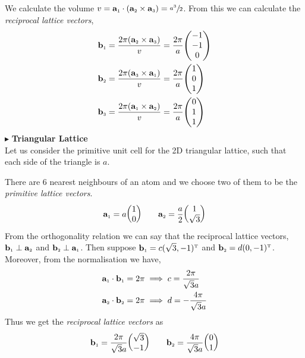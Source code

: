 \documentclass[usenames, svgnames, dvipsnames]{scrartcl}
\newcommand{\tund}[1]{_{\text{\tiny #1}}}
\begin{document}
We calculate the volume $v = \vb{a}\tund{1}\cdot (\vb{a}\tund{2}\times\vb{a}\tund{3} ) = \sfrac{a^3}{2}$. From this we can calculate the \textit{reciprocal lattice vectors},
\begin{align*}
    \vb{b}\tund{1}&= \frac{2\pi (\vb{a}\tund{2}\times \vb{a}\tund{3})}{v} =\frac{2\pi}{a} \mqty(-1\\ -1 \\ 0)\\
     \vb{b}\tund{2}&= \frac{2\pi (\vb{a}\tund{3}\times \vb{a}\tund{1})}{v} =\frac{2\pi}{a}\mqty(1\\ 0 \\ 1)\\
      \vb{b}\tund{3}&= \frac{2\pi (\vb{a}\tund{1}\times \vb{a}\tund{2})}{v} =\frac{2\pi}{a}\mqty(0\\ 1 \\1)
\end{align*}
$\blacktriangleright$ \textbf{Triangular Lattice}\\[0.2cm]
Let us consider the primitive unit cell for the 2D triangular lattice, such that each side of the triangle is $a$.
\begin{figure}[H]
    \centering 
    
\end{figure}
\noindent
There are $6$ nearest neighbours of an atom and we choose two of them to be the \textit{primitive lattice vectors}. 
$$\vb{a}\tund{1} = a\mqty(1\\ 0)\qquad \vb{a}\tund{2} = \frac{a}{2}\mqty(1\\ \sqrt{3}) $$ 
From the orthogonality relation we can say that the reciprocal lattice vectors, $\vb{b}\tund{1}\perp \vb{a}\tund{2}$ and $\vb{b}\tund{2}\perp \vb{a}\tund{1}$. Then suppose $\vb{b}\tund{1} = c(\sqrt{3}, -1)^{\text{\tiny T}}$ and $\vb{b}\tund{2} = d(0,-1)^{\text{\tiny T}}$. Moreover, from the normalisation we have, 
\begin{align*}
    \vb{a}\tund{1} \cdot   \vb{b}\tund{1} &=2\pi \implies c = \frac{2\pi}{\sqrt{3}a}\\
    \vb{a}\tund{2} \cdot   \vb{b}\tund{2} &=2\pi \implies d = -\frac{4\pi}{\sqrt{3}a}
\end{align*}
Thus we get the \textit{reciprocal lattice vectors} as 
$$\vb{b}\tund{1} = \frac{2\pi}{\sqrt{3}a}\mqty(\sqrt{3}\\ -1)\qquad \vb{b}\tund{2} = \frac{4\pi}{\sqrt{3}a}\mqty(0\\1)$$
\end{document}
